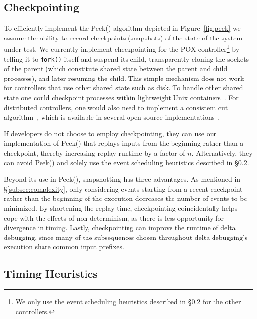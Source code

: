 \subsection{Checkpointing}
\label{subsec:snapshotting}

To efficiently implement the {\sc Peek()} algorithm depicted in
Figure~\ref{fig:peek} we assume the ability to record checkpoints (snapshots) of the state of the
system under test. We currently implement checkpointing for the POX
controller\footnote{We only use the event scheduling heuristics described in
\S\ref{subsec:timing_heuristics} for the other controllers.} by telling it to \verb=fork()= itself and suspend its child,
transparently cloning the sockets of the parent
(which constitute shared state between the parent and child processes),
and later resuming the child. This simple mechanism does
not work for controllers that use other shared state such as disk.
To handle other shared state one could checkpoint processes within
lightweight Unix containers~\cite{lxc}. For distributed controllers, one
would also need to implement a consistent cut
algorithm~\cite{Chandy:1985:DSD:214451.214456}, which is available in several open source
implementations~\cite{ansel2009dmtcp}.

If developers do not choose to employ checkpointing,
they can use our implementation of {\sc Peek()} that replays inputs from
the beginning rather than a checkpoint, thereby increasing replay runtime by
a factor of $n$. Alternatively, they can
avoid {\sc Peek()} and solely use the event scheduling heuristics described in \S\ref{subsec:timing_heuristics}.

Beyond its use in {\sc Peek()}, snapshotting has three advantages.
As mentioned in \S\ref{subsec:complexity}, only considering events starting
from a recent checkpoint rather than the beginning of the execution decreases the number of events to
be minimized. By shortening the replay time, checkpointing coincidentally helps cope
with the effects of non-determinism, as there is less opportunity for
divergence in timing. Lastly, checkpointing can improve the runtime of delta
debugging, since many of the subsequences chosen throughout delta debugging's
execution share common input prefixes.

\subsection{Timing Heuristics}
\label{subsec:timing_heuristics}

